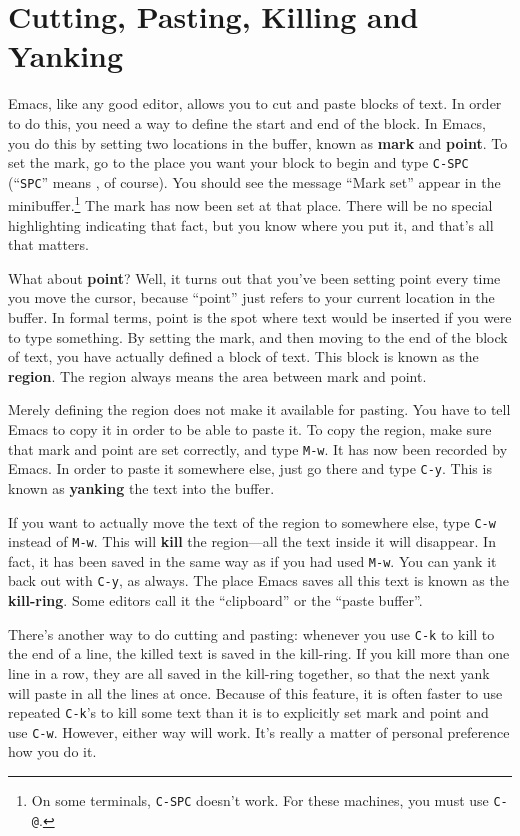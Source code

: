 \section{Cutting, Pasting, Killing and Yanking}
        
Emacs, like any good editor, allows you to cut and paste blocks of
text.  In order to do this, you need a way to define the start and end
of the block.  In Emacs, you do this by setting two locations in the
buffer, known as {\bf mark} and {\bf
  point}.  To set the mark, go to the place you
want your block to begin and type {\tt C-SPC} (``{\tt SPC}'' means
, of course).  You should see the message ``Mark set''
appear in the minibuffer.\footnote{On some terminals, {\tt C-SPC} doesn't
  work.  For these machines, you must use {\tt C-@}.} The mark has now
been set at that place.  There will be no special highlighting
indicating that fact, but you know where you put it, and that's all
that matters.

What about {\bf point}?  Well, it turns out that you've been setting
point every time you move the cursor, because ``point'' just refers to
your current location in the buffer.  In formal terms, point is the
spot where text would be inserted if you were to type something.  By
setting the mark, and then moving to the end of the block of text, you
have actually defined a block of text.  This block is known as the
{\bf region}.  The region always means the area
between mark and point.

Merely defining the region does not make it available for pasting.
You have to tell Emacs to copy it in order to be able to paste it.  To
copy the region, make sure that mark and point are set correctly, and
type {\tt M-w}.  It has now been recorded by Emacs.  In order to paste
it somewhere else, just go there and type {\tt C-y}.  This is known as
{\bf yanking} the text into the buffer.

If you want to actually move the text of the region to somewhere else,
type {\tt C-w} instead of {\tt M-w}.  This will {\bf
  kill} the region---all the text inside it will
disappear.  In fact, it has been saved in the same way as if you had
used {\tt M-w}.  You can yank it back out with {\tt C-y}, as always.
The place Emacs saves all this text is known as the {\bf kill-ring}.
Some editors call it the ``clipboard'' or the ``paste buffer''.

        There's another way to do cutting and pasting: whenever you
use {\tt C-k} to kill to the end of a line, the killed text is saved
in the kill-ring.  If you kill more than one line in a row, they are
all saved in the kill-ring together, so that the next yank will paste
in all the lines at once.  Because of this feature, it is often faster
to use repeated {\tt C-k}'s to kill some text than it is to explicitly
set mark and point and use {\tt C-w}.  However, either way will work.
It's really a matter of personal preference how you do it.

